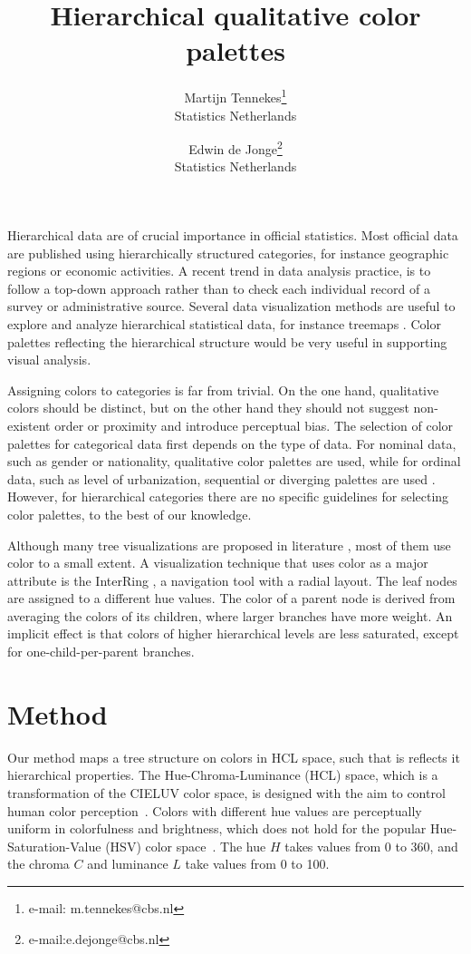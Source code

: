 \documentclass[review]{vgtc}                 %
\title{Hierarchical qualitative color palettes}
\author{Martijn Tennekes\thanks{e-mail: m.tennekes@cbs.nl}\\ %
        \scriptsize Statistics Netherlands %
\and Edwin de Jonge\thanks{e-mail:e.dejonge@cbs.nl}\\ %
     \scriptsize Statistics Netherlands}
\begin{document}

\maketitle

Hierarchical data are of crucial importance in official statistics. Most official data are published using hierarchically structured categories, for instance geographic regions or economic activities. A recent trend in data analysis practice, is to follow a top-down approach rather than to check  each individual record of a survey or administrative source. Several data visualization methods are useful to explore and analyze hierarchical statistical data, for instance treemaps
\cite{shneiderman1992,tennekes2011b}. Color palettes reflecting the  hierarchical structure would be very useful in supporting visual analysis.

Assigning colors to categories is far from trivial. On the one hand, qualitative colors should be distinct, but on the other hand they should not suggest non-existent order or proximity and introduce perceptual bias. The selection of color palettes for categorical data first depends on the type of data. For nominal data, such as gender or nationality, qualitative color palettes are used, while for ordinal data, such as level of urbanization, sequential or diverging palettes are used \cite{brewer03, zeileis2009}. However, for hierarchical categories there are no specific guidelines for selecting color palettes, to the best of our knowledge.

Although many tree visualizations are proposed in literature \cite{schulz2011}, most of them use color to a small extent. A visualization technique that uses color as a major attribute is the InterRing \cite{yang2002}, a navigation tool with a radial layout. The leaf nodes are assigned to a different hue values. The color of a parent node is derived from averaging the colors of its children, where larger branches have more weight. An implicit effect is that colors of higher hierarchical levels are less saturated, except for one-child-per-parent branches.


\section{Method}

Our method maps a tree structure on colors in HCL space, such that is reflects it hierarchical properties. The Hue-Chroma-Luminance (HCL) space, which is a transformation of the CIELUV color space, is designed with the aim to control human color perception~\cite{ihaka2003}.
Colors with different hue values are perceptually uniform in colorfulness and brightness, which does not hold for the popular Hue-Saturation-Value (HSV) color space~\cite{zeileis2009}. The hue $H$ takes values from 0 to 360, and the chroma $C$ and luminance $L$ take values from 0 to 100.
\end{document}
